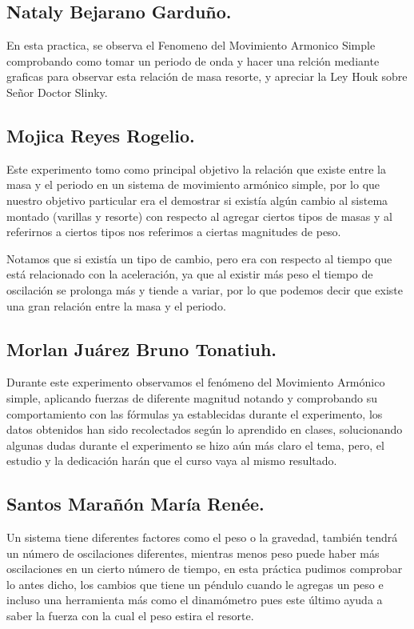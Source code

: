 \documentclass[10pt]{article}
\begin{document}
\begin{multicols}{2}
\subsection*{Nataly Bejarano Garduño.}
En esta practica, se observa el Fenomeno del Movimiento Armonico Simple comprobando como tomar un periodo de onda y hacer una relción mediante graficas para observar esta relación de masa resorte, y apreciar la Ley Houk sobre Señor Doctor Slinky. 
\subsection*{Mojica Reyes Rogelio.}
Este experimento tomo como principal objetivo la relación que existe entre la masa y el periodo en un sistema de movimiento armónico simple, por lo que nuestro objetivo particular era el demostrar si existía algún cambio al sistema montado (varillas y resorte) con respecto al agregar ciertos tipos de masas y al referirnos a ciertos tipos nos referimos a ciertas magnitudes de peso.

Notamos que si existía un tipo de cambio, pero era con respecto al tiempo que está relacionado con la aceleración, ya que al existir más peso el tiempo de oscilación se prolonga más y tiende a variar, por lo que podemos decir que existe una gran relación entre la masa y el periodo.
\subsection*{Morlan Juárez Bruno Tonatiuh.}
Durante este experimento observamos el fenómeno del Movimiento Armónico simple, aplicando fuerzas de diferente magnitud notando y comprobando su comportamiento con las fórmulas ya establecidas durante el experimento, los datos obtenidos han sido recolectados según lo aprendido en clases, solucionando algunas dudas durante el experimento se hizo aún más claro el tema, pero, el estudio y la dedicación harán que el curso vaya al mismo resultado. 
\subsection*{Santos Marañón María Renée.}
Un sistema tiene diferentes factores como el peso o la gravedad, también tendrá un número de oscilaciones diferentes, mientras menos peso puede haber más oscilaciones en un cierto número de tiempo, en esta práctica pudimos comprobar lo antes dicho, los cambios que tiene un péndulo cuando le agregas un peso e incluso una herramienta más como el dinamómetro pues este último ayuda a saber la fuerza con la cual el peso estira el resorte.


\end{multicols}
\end{document}
